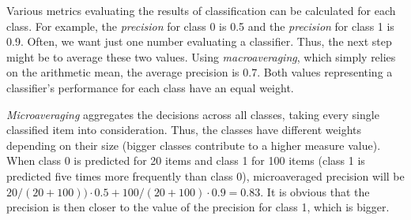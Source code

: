 Various metrics evaluating the results of classification can be calculated for
each class. For example, the \textit{precision} for class 0 is 0.5 and the \textit{precision} for
class 1 is 0.9. Often, we want just one number evaluating a classifier. Thus,
the next step might be to average these two values. Using \textit{macroaveraging}, which
simply relies on the arithmetic mean, the average precision is 0.7. Both values representing a classifier’s performance for each class have an equal weight.

\textit{Microaveraging} aggregates the decisions across all classes, taking every single classified item into consideration. Thus, the classes have different weights
depending on their size (bigger classes contribute to a higher measure value). When class 0 is predicted for 20 items and class 1 for 100 items (class 1 is predicted five times more frequently than class 0), microaveraged precision will be
$
{20}/({20+100})) \cdot 0.5 + {100}/({20+100}) \cdot 0.9 = 0.83.
$
It is obvious that the precision is then closer to the value of the precision for class 1, which is bigger.




